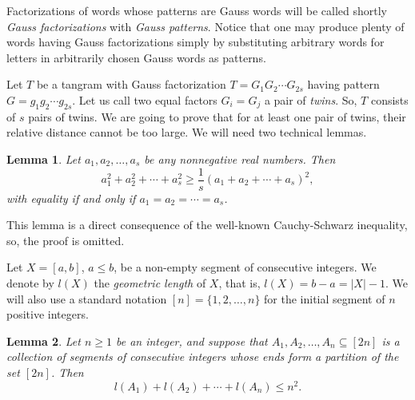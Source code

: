 \documentclass[12pt]{amsart}
\theoremstyle{plain}
\newtheorem{lemma}{Lemma}
\numberwithin{equation}{section}
\begin{document}
Factorizations of words whose patterns are Gauss words will be called shortly \emph{Gauss factorizations} with \emph{Gauss patterns}. Notice that one may produce plenty of words having Gauss factorizations simply by substituting arbitrary words for letters in arbitrarily chosen Gauss words as patterns.

Let $T$ be a tangram with Gauss factorization $T=G_1G_2\cdots G_{2s}$ having pattern $G=g_1g_2\cdots g_{2s}$. Let us call two equal factors $G_i=G_j$ a pair of \emph{twins}. So, $T$ consists of $s$ pairs of twins. We are going to prove that for at least one pair of twins, their relative distance cannot be too large. We will need two technical lemmas.

\begin{lemma}\label{Lemma Sum of Squares Inequality}
	Let $a_1, a_2,\ldots, a_s$ be any nonnegative real numbers. Then $$a_1^2+a_2^2+\cdots +a_s^2\geqslant \frac{1}{s}(a_1+a_2+\cdots+ a_s)^2,$$
	with equality if and only if $a_1=a_2=\cdots =a_s$.
\end{lemma}
This lemma is a direct consequence of the well-known Cauchy-Schwarz inequality, so, the proof is omitted.

Let $X=[a,b]$, $a\leqslant b$, be a non-empty segment of consecutive integers. We denote by $l(X)$ the \emph{geometric length} of $X$, that is, $l(X)=b-a=|X|-1$. We will also use a standard notation $[n]=\{1,2,\ldots,n\}$ for the initial segment of $n$ positive integers.

\begin{lemma}\label{Lemma Interwals on 2n Balls}
	Let $n\geqslant 1$ be an integer, and suppose that $A_1,A_2,\ldots,A_n\subseteq [2n]$ is a collection of segments of consecutive integers whose ends form a partition of the set $[2n]$. Then $$l(A_1)+l(A_2)+\cdots+l(A_n)\leqslant n^2.$$
\end{lemma}
\end{document}
